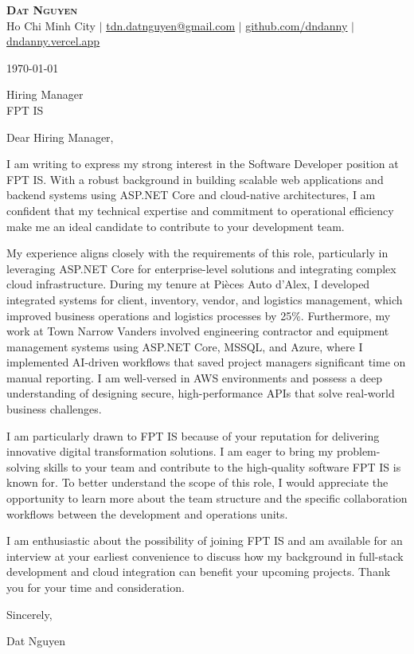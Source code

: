 \documentclass[letterpaper,11pt]{article}
\begin{document}
\begin{center}
\textbf{\Huge \scshape Dat Nguyen} \\ \vspace{1pt}
\small Ho Chi Minh City $|$ \href{mailto:tdn.datnguyen@gmail.com}{\underline{tdn.datnguyen@gmail.com}} $|$
\href{https://github.com/dndanny}{\underline{github.com/dndanny}} $|$
\href{https://dndanny.vercel.app}{\underline{dndanny.vercel.app}}
\end{center}

\today

\vspace{20pt}

Hiring Manager \\
FPT IS \\

\vspace{20pt}

Dear Hiring Manager,

I am writing to express my strong interest in the Software Developer position at FPT IS. With a robust background in building scalable web applications and backend systems using ASP.NET Core and cloud-native architectures, I am confident that my technical expertise and commitment to operational efficiency make me an ideal candidate to contribute to your development team.

My experience aligns closely with the requirements of this role, particularly in leveraging ASP.NET Core for enterprise-level solutions and integrating complex cloud infrastructure. During my tenure at Pièces Auto d'Alex, I developed integrated systems for client, inventory, vendor, and logistics management, which improved business operations and logistics processes by 25\%. Furthermore, my work at Town Narrow Vanders involved engineering contractor and equipment management systems using ASP.NET Core, MSSQL, and Azure, where I implemented AI-driven workflows that saved project managers significant time on manual reporting. I am well-versed in AWS environments and possess a deep understanding of designing secure, high-performance APIs that solve real-world business challenges.

I am particularly drawn to FPT IS because of your reputation for delivering innovative digital transformation solutions. I am eager to bring my problem-solving skills to your team and contribute to the high-quality software FPT IS is known for. To better understand the scope of this role, I would appreciate the opportunity to learn more about the team structure and the specific collaboration workflows between the development and operations units.

I am enthusiastic about the possibility of joining FPT IS and am available for an interview at your earliest convenience to discuss how my background in full-stack development and cloud integration can benefit your upcoming projects. Thank you for your time and consideration.

\vspace{20pt}

Sincerely,

Dat Nguyen
\end{document}
